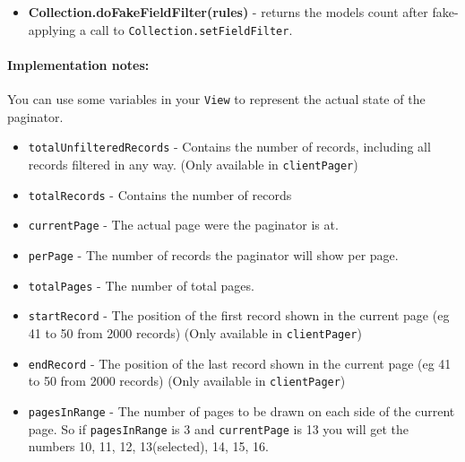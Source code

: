 \documentclass[9pt]{book}
\begin{document}
\begin{itemize}
\itemsep1pt\parskip0pt
\item
  \textbf{Collection.doFakeFieldFilter(rules)} - returns the models
  count after fake-applying a call to
  \texttt{Collection.setFieldFilter}.
\end{itemize}

\paragraph{Implementation notes:}\label{implementation-notes}

You can use some variables in your \texttt{View} to represent the actual
state of the paginator.

\begin{itemize}
\itemsep1pt\parskip0pt
\item
  \texttt{totalUnfilteredRecords} - Contains the number of records,
  including all records filtered in any way. (Only available in
  \texttt{clientPager})
\item
  \texttt{totalRecords} - Contains the number of records
\item
  \texttt{currentPage} - The actual page were the paginator is at.
\item
  \texttt{perPage} - The number of records the paginator will show per
  page.
\item
  \texttt{totalPages} - The number of total pages.
\item
  \texttt{startRecord} - The position of the first record shown in the
  current page (eg 41 to 50 from 2000 records) (Only available in
  \texttt{clientPager})
\item
  \texttt{endRecord} - The position of the last record shown in the
  current page (eg 41 to 50 from 2000 records) (Only available in
  \texttt{clientPager})
\item
  \texttt{pagesInRange} - The number of pages to be drawn on each side
  of the current page. So if \texttt{pagesInRange} is 3 and
  \texttt{currentPage} is 13 you will get the numbers 10, 11, 12,
  13(selected), 14, 15, 16.
\end{itemize}
\end{document}
